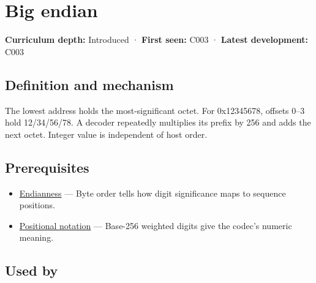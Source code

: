 \hypertarget{appendix-92e040df969a}{}\label{referencestart:appendix-92e040df969a}
\section{Big endian}\label{appendix-92e040df969a-big-endian}

\hypertarget{appendix-92e040df969a-big-endian}{}

\textbf{Curriculum depth:} Introduced · \textbf{First seen:} C003 · \textbf{Latest development:} C003

\begin{allmightroledefinition}

\subsection{Definition and mechanism}\label{appendix-92e040df969a-definition-and-mechanism}

\hypertarget{appendix-92e040df969a-definition-and-mechanism}{}

The lowest address holds the most-significant octet. For 0x12345678, offsets 0--3 hold 12/34/56/78. A decoder repeatedly multiplies its prefix by 256 and adds the next octet. Integer value is independent of host order.

\end{allmightroledefinition}

\subsection{Prerequisites}\label{appendix-92e040df969a-prerequisites}

\hypertarget{appendix-92e040df969a-prerequisites}{}

\begin{itemize}
\tightlist
\item
  \hyperref[appendix-bc07c3d25b18]{Endianness} --- Byte order tells how digit significance maps to sequence positions.
\item
  \hyperref[appendix-83c3f28f7bda]{Positional notation} --- Base-256 weighted digits give the codec's numeric meaning.
\end{itemize}

\subsection{Used by}\label{appendix-92e040df969a-used-by}

\hypertarget{appendix-92e040df969a-used-by}{}

